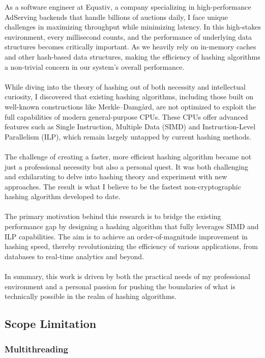 \documentclass[10pt]{article}
\begin{document}
As a software engineer at Equativ, a company specializing in high-performance AdServing backends that handle billions of auctions daily,
I face unique challenges in maximizing throughput while minimizing latency. In this high-stakes environment, every millisecond counts, and the performance of underlying data structures becomes critically important. As we heavily rely on in-memory caches and other hash-based data structures, making the efficiency of hashing algorithms a non-trivial concern in our system's overall performance.\\\\
While diving into the theory of hashing out of both necessity and intellectual curiosity, I discovered that existing hashing algorithms, including those built on well-known constructions like Merkle–Damgård, are not optimized to exploit the full capabilities of modern general-purpose CPUs.
These CPUs offer advanced features such as Single Instruction, Multiple Data (SIMD) and Instruction-Level Parallelism (ILP), which remain largely untapped by current hashing methods.\\\\
The challenge of creating a faster, more efficient hashing algorithm became not just a professional necessity but also a personal quest.
It was both challenging and exhilarating to delve into hashing theory and experiment with new approaches. The result is what I believe to be the fastest non-cryptographic hashing algorithm developed to date.\\\\
The primary motivation behind this research is to bridge the existing performance gap by designing a hashing algorithm that fully leverages SIMD and ILP capabilities. The aim is to achieve an order-of-magnitude improvement in hashing speed, thereby revolutionizing the efficiency of various applications, from databases to real-time analytics and beyond.\\\\
In summary, this work is driven by both the practical needs of my professional environment and a personal passion for pushing the boundaries of what is technically possible in the realm of hashing algorithms.

\subsection{Scope Limitation}

\subsubsection{Multithreading}
\end{document}

